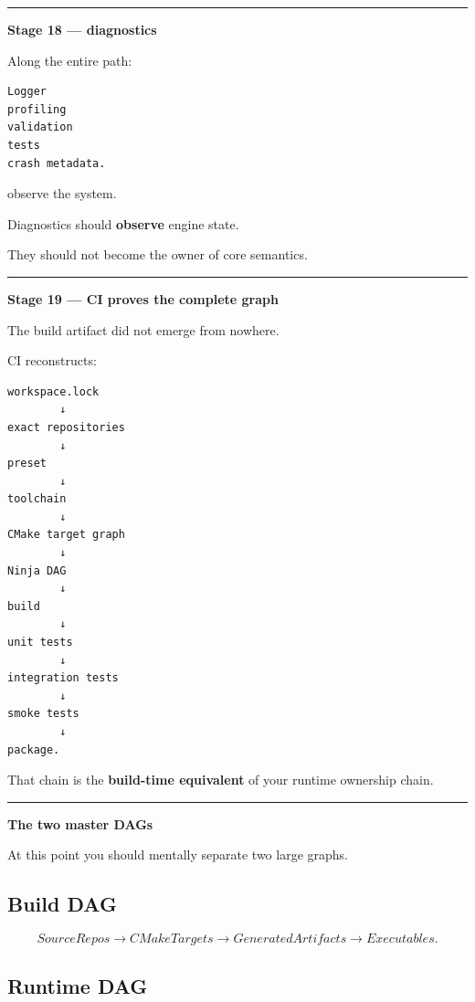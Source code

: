 \begin{center}\rule{0.5\linewidth}{0.5pt}\end{center}

\textbf{Stage 18 --- diagnostics}

Along the entire path:

\begin{verbatim}
Logger
profiling
validation
tests
crash metadata.
\end{verbatim}

observe the system.

Diagnostics should \textbf{observe} engine state.

They should not become the owner of core semantics.

\begin{center}\rule{0.5\linewidth}{0.5pt}\end{center}

\textbf{Stage 19 --- CI proves the complete graph}

The build artifact did not emerge from nowhere.

CI reconstructs:

\begin{verbatim}
workspace.lock
        ↓
exact repositories
        ↓
preset
        ↓
toolchain
        ↓
CMake target graph
        ↓
Ninja DAG
        ↓
build
        ↓
unit tests
        ↓
integration tests
        ↓
smoke tests
        ↓
package.
\end{verbatim}

That chain is the \textbf{build-time equivalent} of your runtime ownership chain.

\begin{center}\rule{0.5\linewidth}{0.5pt}\end{center}

\textbf{The two master DAGs}

At this point you should mentally separate two large graphs.

\subsection{Build DAG}\label{05-engine-i-ch012-build-dag}

\[
SourceRepos
\rightarrow
CMakeTargets
\rightarrow
GeneratedArtifacts
\rightarrow
Executables.
\]

\subsection{Runtime DAG}\label{05-engine-i-ch012-runtime-dag}

